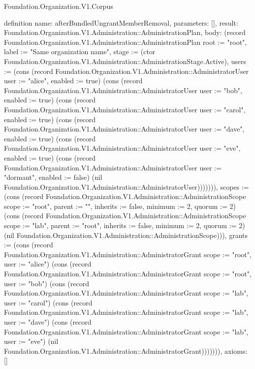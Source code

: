 \begin{lexlean}{Foundation.Organization.V1.Corpus}
\begin{semanticmodule}
definition{
  name: afterBundledUngrantMemberRemoval,
  parameters: [],
  result: Foundation.Organization.V1.Administration::AdministrationPlan,
  body: (record Foundation.Organization.V1.Administration::AdministrationPlan {root := "root", label := "Same organization name", stage := (ctor Foundation.Organization.V1.Administration::AdministrationStage.Active), users := (cons (record Foundation.Organization.V1.Administration::AdministratorUser {user := "alice", enabled := true}) (cons (record Foundation.Organization.V1.Administration::AdministratorUser {user := "bob", enabled := true}) (cons (record Foundation.Organization.V1.Administration::AdministratorUser {user := "carol", enabled := true}) (cons (record Foundation.Organization.V1.Administration::AdministratorUser {user := "dave", enabled := true}) (cons (record Foundation.Organization.V1.Administration::AdministratorUser {user := "eve", enabled := true}) (cons (record Foundation.Organization.V1.Administration::AdministratorUser {user := "dormant", enabled := false}) (nil Foundation.Organization.V1.Administration::AdministratorUser))))))), scopes := (cons (record Foundation.Organization.V1.Administration::AdministrationScope {scope := "root", parent := "", inherits := false, minimum := 2, quorum := 2}) (cons (record Foundation.Organization.V1.Administration::AdministrationScope {scope := "lab", parent := "root", inherits := false, minimum := 2, quorum := 2}) (nil Foundation.Organization.V1.Administration::AdministrationScope))), grants := (cons (record Foundation.Organization.V1.Administration::AdministratorGrant {scope := "root", user := "alice"}) (cons (record Foundation.Organization.V1.Administration::AdministratorGrant {scope := "root", user := "bob"}) (cons (record Foundation.Organization.V1.Administration::AdministratorGrant {scope := "lab", user := "carol"}) (cons (record Foundation.Organization.V1.Administration::AdministratorGrant {scope := "lab", user := "dave"}) (cons (record Foundation.Organization.V1.Administration::AdministratorGrant {scope := "lab", user := "eve"}) (nil Foundation.Organization.V1.Administration::AdministratorGrant))))))}),
  axioms: []
}


\end{semanticmodule}
\end{lexlean}
